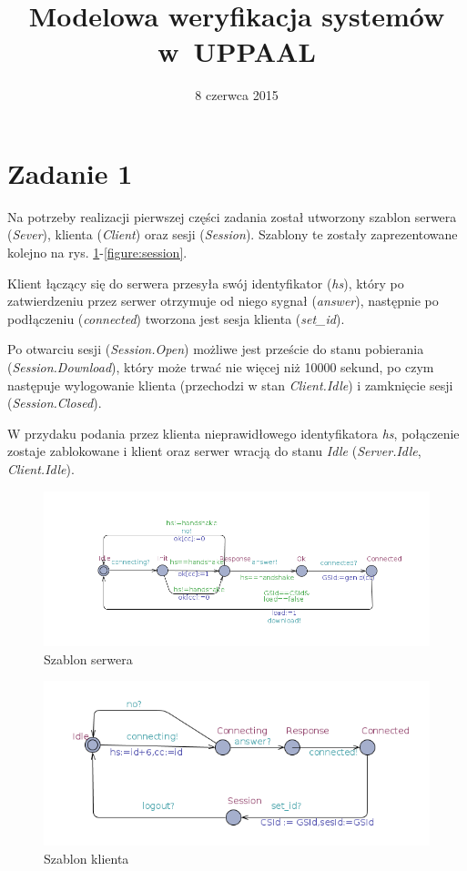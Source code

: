 \documentclass{article}
\title{Modelowa weryfikacja systemów w~UPPAAL}
\date{8 czerwca 2015}
\begin{document}
	\maketitle
	
	\section{Zadanie 1}
	
		Na potrzeby realizacji pierwszej części zadania został utworzony szablon serwera (\textit{Sever}), klienta (\textit{Client}) oraz sesji (\textit{Session}). Szablony te zostały zaprezentowane kolejno na rys. \ref{figure:server}-\ref{figure:session}.
		
		Klient łączący się do serwera przesyła swój identyfikator (\textit{hs}), który po zatwierdzeniu przez serwer otrzymuje od niego sygnał (\textit{answer}), następnie po podłączeniu (\textit{connected}) tworzona jest sesja klienta (\textit{set\_id}).
		
		Po otwarciu sesji (\textit{Session.Open}) możliwe jest przeście do stanu pobierania (\textit{Session.Download}), który może trwać nie więcej niż 10000 sekund, po czym następuje wylogowanie klienta (przechodzi w stan \textit{Client.Idle}) i zamknięcie sesji (\textit{Session.Closed}).
		
		W przydaku podania przez klienta nieprawidłowego identyfikatora \textit{hs}, połączenie zostaje zablokowane i klient oraz serwer wracją do stanu \textit{Idle} (\textit{Server.Idle}, \textit{Client.Idle}).
		
		\begin{figure}[h]
			\includegraphics[width=\textwidth]{lab23/server}
			\caption{Szablon serwera}
			\label{figure:server}
		\end{figure}
		
		\begin{figure}[h]
			\includegraphics[width=\textwidth]{lab23/client}
			\caption{Szablon klienta}
			\label{figure:client}
		\end{figure}
		
\end{document}
